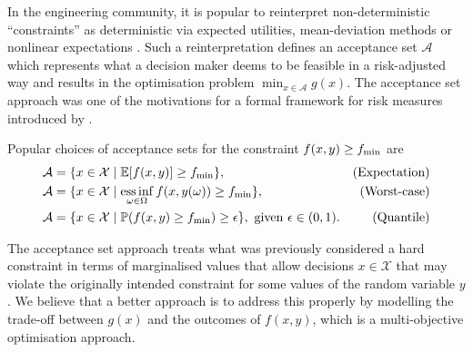 \documentclass[main.tex]{subfiles}
\begin{document}
In the engineering community, it is popular to
reinterpret non-deterministic ``constraints'' as deterministic via
expected utilities, mean-deviation methods or nonlinear
expectations
\citep{rockafellar2007coherent,rockafellar2015engineering}.
Such a reinterpretation defines an acceptance set $\mathcal{A}$
which represents what a decision maker deems to be feasible in a
risk-adjusted way and results in the optimisation problem
$\min_{x\in\mathcal{A}} g(x)$.
The acceptance set approach was one of the motivations for a formal
framework for risk measures introduced by \citet{artzner1999coherent}.
\begin{example}
  Popular choices of acceptance sets for the constraint $f(x,y)\geq
  f_{\textnormal{min}}$ are
  \begin{align}
    \mathcal{A}&=\{x\in\mathcal{X} \mid
                 \mathbb{E}[f(x,y)]\geq f_{\textnormal{min}}\},
    &\textnormal{(Expectation)}\\
    \mathcal{A}&=\{x\in\mathcal{X} \mid
                 \operatorname*{ess\,inf}_{\omega\in\Omega}f(x,y(\omega))\geq
                 f_{\textnormal{min}}\},
    &\textnormal{(Worst-case)}\\
    \mathcal{A} &= \{x\in\mathcal{X}\mid
                  \mathbb{P}(f(x,y)\geq f_{\textnormal{min}})\geq \epsilon\},
                  \text{ given }\epsilon\in(0,1).
    &\textnormal{(Quantile)}
  \end{align}
\end{example}

The acceptance set approach treats what was previously considered a
hard constraint in terms of marginalised values that allow decisions $x\in\mathcal{X}$
that may violate the originally intended constraint for some values of the random
variable $y$. We believe that a better approach is to address this
properly by modelling the trade-off between $g(x)$ and the outcomes of $f(x,y)$,
which is a multi-objective optimisation approach.
\end{document}
